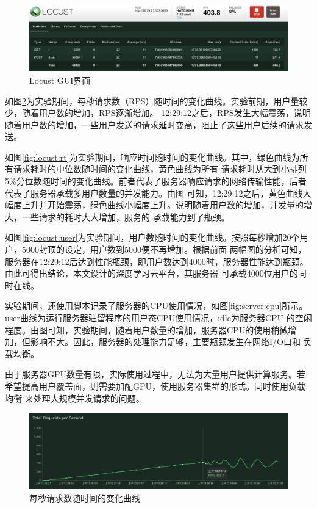 \begin{figure}[h]
    \centering
    \includegraphics[width=\textwidth]{pic/chap5/Locust_test.png}
    \caption{Locust GUI界面}
    \label{fig:locust:gui}
\end{figure}

如图\ref{fig:locust:rps}为实验期间，每秒请求数（RPS）随时间的变化曲线。实验前期，用户量较少，随着用户数的增加，RPS逐渐增加。
12:29:12之后，RPS发生大幅震荡，说明随着用户数的增加，一些用户发送的请求延时变高，阻止了这些用户后续的请求发送。

如图\ref{fig:locust:rt}为实验期间，响应时间随时间的变化曲线。其中，绿色曲线为所有请求耗时的中位数随时间的变化曲线，黄色曲线为所有
请求耗时从大到小排列5\%分位数随时间的变化曲线。前者代表了服务器响应请求的网络传输性能，后者代表了服务器承载多用户数量的并发能力。由图
可知，12:29:12之后，黄色曲线大幅度上升并开始震荡，绿色曲线小幅度上升。说明随着用户数的增加，并发量的增大，一些请求的耗时大大增加，服务的
承载能力到了瓶颈。

如图\ref{fig:locust:user}为实验期间，用户数随时间的变化曲线。按照每秒增加20个用户，5000封顶的设定，用户数到5000便不再增加。根据前面
两幅图的分析可知，服务器在12:29:12后达到性能瓶颈，即用户数达到4000时，服务器性能达到瓶颈。由此可得出结论，本文设计的深度学习云平台，其服务器
可承载4000位用户的同时在线。

实验期间，还使用脚本记录了服务器的CPU使用情况，如图\ref{fig:server:cpu}所示。user曲线为运行服务器驻留程序的用户态CPU使用情况，idle为服务器CPU
的空闲程度。由图可知，实验期间，随着用户数量的增加，服务器CPU的使用稍微增加，但影响不大。因此，服务器的处理能力足够，主要瓶颈发生在网络I/O口和
负载均衡。

由于服务器GPU数量有限，实际使用过程中，无法为大量用户提供计算服务。若希望提高用户覆盖面，则需要加配GPU，使用服务器集群的形式。同时使用负载均衡
来处理大规模并发请求的问题。

\begin{figure}[h]
    \centering
    \includegraphics[width=\textwidth]{pic/chap5/rsp.png}
    \caption{每秒请求数随时间的变化曲线}
    \label{fig:locust:rps}
\end{figure}


